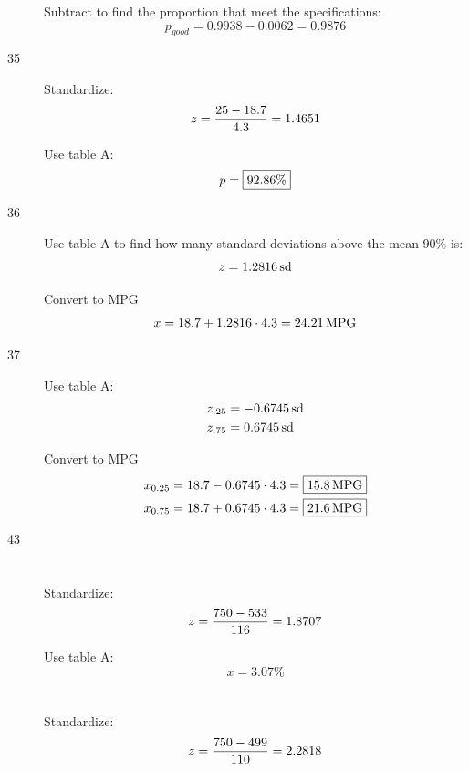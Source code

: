 \documentclass[letterpaper, landscape]{exam}
\begin{document}
\begin{description}
\begin{parts}
              Subtract to find the proportion that meet the specifications:
              \[
                p_{good} = 0.9938 - 0.0062 = \boxed{ 0.9876 }
              \]

        \end{parts}

      \item[35]
        Standardize:
        \[
          z = \frac{25 - 18.7}{4.3} = 1.4651 \\
        \]

        Use table A:\@
        \[
          p = \boxed{ 92.86 \% } \\
        \]

      \item[36]
        Use table A to find how many standard deviations above the mean 90\% is: 
        \[
          z = \unit[1.2816]{sd}
        \]

        Convert to MPG
        \[
          x = 18.7 + 1.2816 \cdot 4.3 = \unit[24.21]{MPG}
        \]

      \item[37]
        Use table A:\@
        \begin{align*}
          z_{.25} &= \unit[-0.6745]{sd} \\
          z_{.75} &= \unit[0.6745]{sd} \\
        \end{align*}

        Convert to MPG
        \begin{align*}
          x_{0.25} &= 18.7 - 0.6745 \cdot 4.3 = \boxed{ \unit[15.8]{MPG} } \\
          x_{0.75} &= 18.7 + 0.6745 \cdot 4.3 = \boxed{ \unit[21.6]{MPG} } \\
        \end{align*}

      \item[43]
        \begin{parts}
          \part{}
            Standardize:
            \[
              z = \frac{750 - 533}{116} = 1.8707 \\
            \]

            Use table A:\@
            \[
              x = \boxed{ 3.07 \% }
            \]

          \part{}
            Standardize:
            \[
              z = \frac{750 - 499}{110} = 2.2818 \\
            \]


\end{parts}
\end{description}
\end{document}
